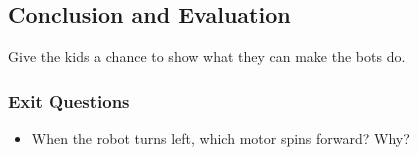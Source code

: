 \documentclass{lessonplan}
\begin{document}
    \subsection{Conclusion and Evaluation}
      Give the kids a chance to show what they can make the bots do.
      \subsubsection{Exit Questions}
      \begin{itemize}
        \item When the robot turns left, which motor spins forward? Why?
      \end{itemize}
\end{document}
